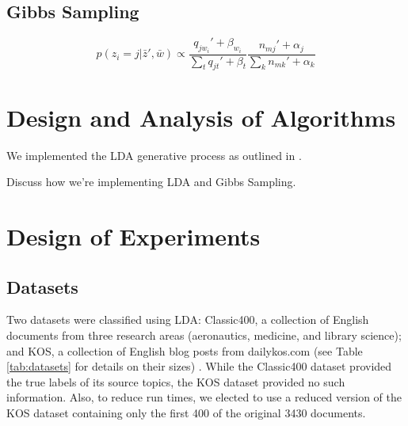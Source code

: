 \documentclass[10pt]{article}
\begin{document}
\subsection{Gibbs Sampling}
\label{sec:gibbs}

\begin{equation}
    p(z_i = j | \bar{z}', \bar{w}) \propto \frac{q_{j w_i}' + \beta_{w_i}}{\sum_t q_{jt}' + \beta_t} \frac{n_{mj}' + \alpha_j}{\sum_k n_{mk}' + \alpha_k}
\end{equation}



\section{Design and Analysis of Algorithms}
\label{sec:algorithms}

We implemented the LDA generative process as outlined in \cite{CSE250B}.

Discuss how we're implementing LDA and Gibbs Sampling.



\section{Design of Experiments}
\label{sec:experiments}

%
%
\subsection{Datasets}
Two datasets were classified using LDA: Classic400, a collection of English documents from three research areas (aeronautics, medicine, and library science); and KOS, a collection of English blog posts from dailykos.com (see Table \ref{tab:datasets} for details on their sizes) \cite{Classic400, KOS_dataset}. While the Classic400 dataset provided the true labels of its source topics, the KOS dataset provided no such information. Also, to reduce run times, we elected to use a reduced version of the KOS dataset containing only the first 400 of the original 3430 documents.
\end{document}
